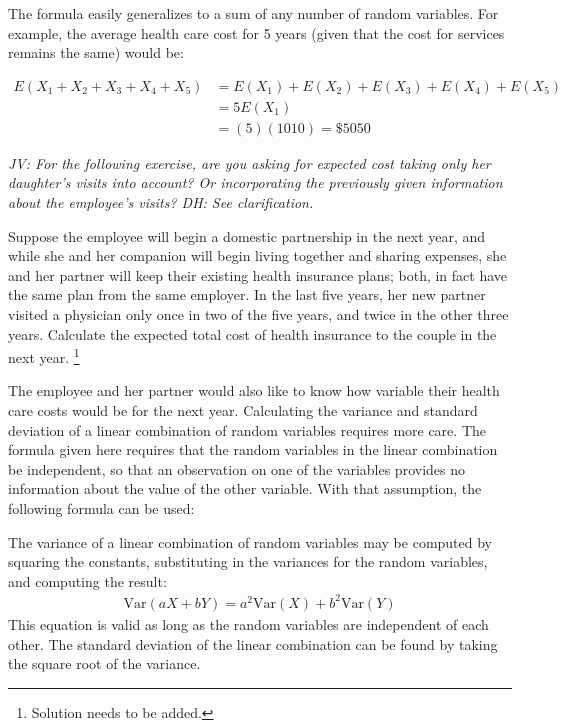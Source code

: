 The formula easily generalizes to a sum of any number of random variables. For example, the average health care cost for 5 years (given that the cost for services remains the same) would be: 

\begin{align*}
	E(X_1 + X_2 + X_3 + X_4 + X_5) &= E(X_1) + E(X_2) + E(X_3) + E(X_4) + E(X_5) \\
	         &= 5E(X_1) \\
			 &=(5)(1010) = \$5050
\end{align*}

\textit{JV: For the following exercise, are you asking for expected cost taking only her daughter's visits into account? Or incorporating the previously given information about the employee's visits?  DH: See clarification.}

\begin{exercise} \label{healthCareCostsPartner}
	Suppose the employee will begin a domestic partnership in the next year, and while she and her companion will begin living together and sharing expenses, she and her partner will keep their existing health insurance plans; both, in fact have the same plan from the same employer.  In the last five years, her new partner visited a physician only once in two of the five years, and twice in the other three years.   Calculate the expected total cost of health insurance to the couple in the next year. \footnote{Solution needs to be added.}
\end{exercise}

The employee and her partner would also like to know how variable their health care costs would be for the next year.  Calculating the variance and standard deviation of a linear combination of random variables requires more care.  The formula given here requires that the random variables in the linear combination be independent, so that an observation on one of the variables provides no information about the value of the other variable.  With that assumption, the following formula can be used:

\begin{termBox}{
The variance of a linear combination of random variables may be computed by squaring the constants, substituting in the variances for the random variables, and computing the result:
\begin{align*}
\text{Var}(aX + bY) = a^2 \text{Var}(X) + b^2\text{Var}(Y)
\end{align*}
This equation is valid as long as the random variables are independent of each other. The standard deviation of the linear combination can be found by taking the square root of the variance.}
\end{termBox}

